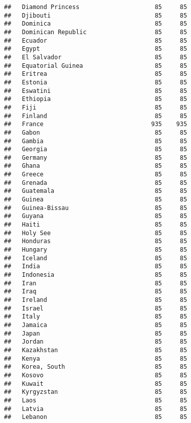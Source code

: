 \documentclass[]{article}
\begin{document}
\begin{verbatim}
##   Diamond Princess                     85     85
##   Djibouti                             85     85
##   Dominica                             85     85
##   Dominican Republic                   85     85
##   Ecuador                              85     85
##   Egypt                                85     85
##   El Salvador                          85     85
##   Equatorial Guinea                    85     85
##   Eritrea                              85     85
##   Estonia                              85     85
##   Eswatini                             85     85
##   Ethiopia                             85     85
##   Fiji                                 85     85
##   Finland                              85     85
##   France                              935    935
##   Gabon                                85     85
##   Gambia                               85     85
##   Georgia                              85     85
##   Germany                              85     85
##   Ghana                                85     85
##   Greece                               85     85
##   Grenada                              85     85
##   Guatemala                            85     85
##   Guinea                               85     85
##   Guinea-Bissau                        85     85
##   Guyana                               85     85
##   Haiti                                85     85
##   Holy See                             85     85
##   Honduras                             85     85
##   Hungary                              85     85
##   Iceland                              85     85
##   India                                85     85
##   Indonesia                            85     85
##   Iran                                 85     85
##   Iraq                                 85     85
##   Ireland                              85     85
##   Israel                               85     85
##   Italy                                85     85
##   Jamaica                              85     85
##   Japan                                85     85
##   Jordan                               85     85
##   Kazakhstan                           85     85
##   Kenya                                85     85
##   Korea, South                         85     85
##   Kosovo                               85     85
##   Kuwait                               85     85
##   Kyrgyzstan                           85     85
##   Laos                                 85     85
##   Latvia                               85     85
##   Lebanon                              85     85

\end{verbatim}
\end{document}
